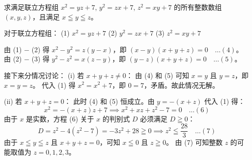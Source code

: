 \begin{questions}

\question
求满足联立方程组 $x^2 = yz + 7$, $y^2 = zx + 7$, $z^2 = xy + 7$ 的所有整数数组 $(x, y, z)$，且满足 $x \leqq y \leqq z$。

\begin{solution}
对于联立方程组：
(1) $x^2 = yz + 7$
(2) $y^2 = zx + 7$
(3) $z^2 = xy + 7$

由 (1) $-$ (2) 得 $x^2 - y^2 = z(y - x)$，即 $(x - y)(x + y + z) = 0 \quad \dots (4)$。
由 (2) $-$ (3) 得 $y^2 - z^2 = x(z - y)$，即 $(y - z)(x + y + z) = 0 \quad \dots (5)$。

接下来分情况讨论：
(i) 若 $x + y + z \neq 0$：
由 (4) 和 (5) 可知 $x = y$ 且 $y = z$，即 $x = y = z$。
代入 (1) 得 $x^2 = x^2 + 7$，即 $0 = 7$，矛盾。故此情况无解。

(ii) 若 $x + y + z = 0$：
此时 (4) 和 (5) 恒成立。由 $y = -(x + z)$ 代入 (1) 得：
\[
x^2 = -(x + z)z + 7 \implies x^2 + xz + z^2 - 7 = 0 \quad \dots (6)
\]
由于 $x$ 是实数，方程 (6) 关于 $x$ 的判别式 $D$ 必须满足 $D \geqq 0$：
\[
D = z^2 - 4(z^2 - 7) = -3z^2 + 28 \geqq 0 \implies z^2 \leqq \frac{28}{3} \quad \dots (7)
\]
由于 $x \leqq y \leqq z$ 且 $x + y + z = 0$，可知 $x \leqq 0$ 且 $z \geqq 0$。
由 (7) 可知整数 $z$ 的可能取值为 $z = 0, 1, 2, 3$。


\end{solution}
\end{questions}
